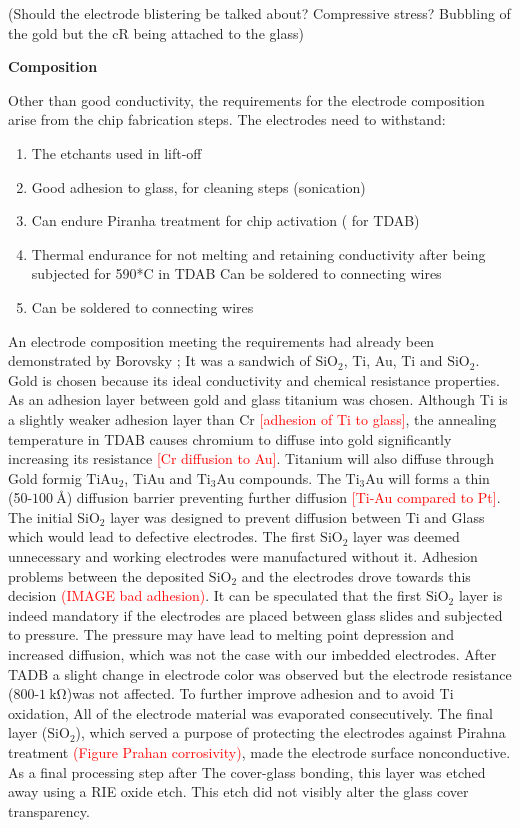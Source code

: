 \documentclass[draft]{jyflluk}
\begin{document}
(Should the electrode blistering be talked about?  Compressive stress? Bubbling of the gold but the cR being attached to the glass)

\textbf{Composition}

Other than good conductivity, the requirements for the electrode composition arise from the chip fabrication steps. The electrodes need to withstand:
\begin{enumerate}
    \renewcommand{\labelenumi}{\Roman{enumi}} 
    \item The etchants used in lift-off
    \item Good adhesion to glass, for cleaning steps (sonication)
    \item Can endure Piranha treatment for chip activation ( for TDAB)
    \item Thermal endurance for not melting and retaining conductivity after being subjected for 590*C in TDAB Can be soldered to connecting wires
    \item Can be soldered to connecting wires
\end{enumerate}

An electrode composition meeting the requirements had already been demonstrated by Borovsky \cite{borovsky}; It was a sandwich of $\mathrm{SiO_{2}}$, Ti, Au, Ti and $\mathrm{SiO_{2}}$. Gold is chosen because its ideal conductivity and chemical resistance properties. As an adhesion layer between gold and glass titanium was chosen. Although Ti is a slightly weaker adhesion layer than Cr \textcolor{red}{[adhesion of Ti to glass]}, the annealing temperature in TDAB causes chromium to diffuse into gold significantly increasing its resistance \textcolor{red}{[Cr diffusion to Au]}. Titanium will also diffuse through Gold formig  $\mathrm{TiAu_2}$, TiAu and  $\mathrm{Ti_3 Au}$ compounds. The $\mathrm{Ti_3 Au}$ will  forms a thin (50-$\SI{100}{\angstrom}$) diffusion barrier preventing further diffusion \textcolor{red}{[Ti-Au compared to Pt]}. The initial $\mathrm{SiO_2}$ layer was designed to prevent diffusion between Ti and Glass which would lead to defective electrodes.  The first $\mathrm{SiO_2}$ layer was deemed unnecessary and working electrodes were manufactured without it. Adhesion problems between the deposited $\mathrm{SiO_2}$ and the electrodes drove towards this decision \textcolor{red}{(IMAGE bad adhesion)}. It can be speculated that the first $\mathrm{SiO_2}$ layer is indeed mandatory if the electrodes are placed between glass slides and subjected to pressure. The pressure may have lead to melting point depression and increased diffusion, which was not the case with our imbedded electrodes. After TADB a slight change in electrode color was observed but the electrode resistance (800-$\SI{1}{\kilo \ohm}$)was not affected.
To further improve adhesion and to avoid Ti oxidation, All of the electrode material was evaporated consecutively. The final layer ($\mathrm{SiO_2}$), which served a purpose of protecting the electrodes against Pirahna treatment \textcolor{red}{(Figure Prahan corrosivity)}, made the electrode surface nonconductive. As a final processing step after The cover-glass bonding, this layer was etched away using a RIE oxide etch. This etch did not visibly alter the glass cover transparency.
\end{document}

